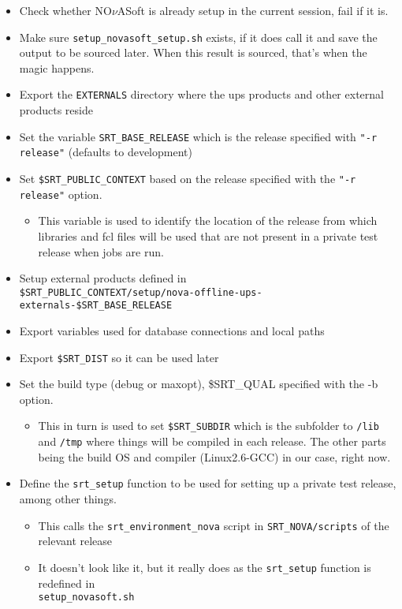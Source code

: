 \documentclass[letterpaper,10pt]{article}
\newcommand{\nova}{NO$\nu$A}
\begin{document}
\begin{itemize}
\item Check whether \nova Soft is already setup in the current session, fail if it is.
\item Make sure \verb|setup_novasoft_setup.sh| exists, if it does call it and save the output to be sourced later. When this result is sourced, that's when the magic happens.
\item Export the \verb|EXTERNALS| directory where the ups products and other external products reside
\item Set the variable \verb|SRT_BASE_RELEASE| which is the release specified with \verb|"-r release"| (defaults to development)
\item Set \verb|$SRT_PUBLIC_CONTEXT| based on the release specified with the \verb|"-r release"| option.
  \begin{itemize}
  \item This variable is used to identify the location of the release from which libraries and fcl files will be used that are not present in a private test release when jobs are run. 
  \end{itemize}
\item Setup external products defined in \\ \verb|$SRT_PUBLIC_CONTEXT/setup/nova-offline-ups-externals-$SRT_BASE_RELEASE|
\item Export variables used for database connections and local paths
\item Export \verb|$SRT_DIST| so it can be used later
\item Set the build type (debug or maxopt), \$SRT\_QUAL specified with the -b option.
  \begin{itemize}
  \item This in turn is used to set \verb|$SRT_SUBDIR| which is the subfolder to \verb|/lib| and \verb|/tmp| where things will be compiled in each release. The other parts being the build OS and compiler (Linux2.6-GCC) in our case, right now.
  \end{itemize}

\item Define the \verb|srt_setup| function to be used for setting up a private test release, among other things.
  \begin{itemize}
  \item This calls the \verb|srt_environment_nova| script in \verb|SRT_NOVA/scripts| of the relevant release
  \item It doesn't look like it, but it really does as the \verb|srt_setup| function is redefined in \\ \verb|setup_novasoft.sh|
  \end{itemize}
  




\end{itemize}
\end{document}
